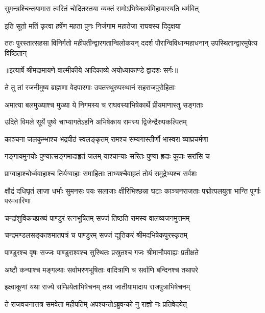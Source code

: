 \twolineshloka
{सुमन्त्रश्चिन्तयामास त्वरितं चोदितस्तया}
{व्यक्तं रामोऽभिषेकार्थमिहायास्यति धर्मवित्} %

\twolineshloka
{इति सूतो मतिं कृत्वा हर्षेण महता पुनः}
{निर्जगाम महातेजा राघवस्य दिदृक्षया} %

\fourlineindentedshloka
{ततः पुरस्तात्सहसा विनिर्गतो}
{महीपतीन्द्वारगतान्विलोकयन्}
{ददर्श पौरान्विविधान्महाधनान्}
{उपस्थितान्द्वारमुपेत्य विष्ठितान्} %


{॥इत्यार्षे श्रीमद्रामायणे वाल्मीकीये आदिकाव्ये अयोध्याकाण्डे द्वादशः सर्गः॥}


\twolineshloka
{ते तु तां रजनीमुष्य ब्राह्मणा वेदपारगाः}
{उपतस्थुरुपस्थानं सहराजपुरोहिताः} %

\twolineshloka
{अमात्या बलमुख्याश्च मुख्या ये निगमस्य च}
{राघवस्याभिषेकार्थे प्रीयमाणास्तु सङ्गताः} %

\twolineshloka
{उदिते विमले सूर्ये पुष्ये चाभ्यागतेऽहनि}
{अभिषेकाय रामस्य द्विजेन्द्रैरुपकल्पितम्} %

\twolineshloka
{काञ्चना जलकुम्भाश्च भद्रपीठं स्वलङ्कृतम्}
{रामश्च सम्यगास्तीर्णो भास्वरा व्याघ्रचर्मणा} %

\twolineshloka
{गङ्गायमुनयोः पुण्यात्सङ्गमादाहृतं जलम्}
{याश्चान्याः सरितः पुण्या ह्रदाः कूपाः सरांसि च} %

\twolineshloka
{प्राग्वाहाश्चोर्ध्ववाहाश्च तिर्यग्वाहाः समाहिताः}
{ताभ्यश्चैवाहृतं तोयं समुद्रेभ्यश्च सर्वशः} %

\threelineshloka
{क्षौद्रं दधिघृतं लाजा धर्भाः सुमनसः पयः}
{सलाजाः क्षीरिभिश्छन्ना घटाः काञ्चनराजताः}
{पद्मोत्पलयुता भान्ति पूर्णाः परमवारिणा} %

\twolineshloka
{चन्द्रांशुविकचप्रख्यं पाण्डुरं रत्नभूषितम्}
{सज्जं तिष्ठति रामस्य वालव्यजनमुत्तमम्} %

\twolineshloka
{चन्द्रमण्डलसङ्काशमातपत्रं च पाण्डुरम्}
{सज्जं द्युतिकरं श्रीमदभिषेकपुरस्कृतम्} %

\twolineshloka
{पाण्डुरश्च वृषः सज्जः पाण्डुराश्वश्च सुस्थितः}
{प्रस्रुतश्च गजः श्रीमानौपवाह्यः प्रतीक्षते} %

\twolineshloka
{अष्टौ कन्याश्च मङ्गल्याः सर्वाभरणभूषिताः}
{वादित्राणि च सर्वाणि बन्दिनश्च तथापरे} %

\twolineshloka
{इक्ष्वाकूणां यथा राज्ये सम्भ्रियेताभिषेचनम्}
{तथा जातीयामादाय राजपुत्राभिषेचनम्} %

\twolineshloka
{ते राजवचनात्तत्र समवेता महीपतिम्}
{अपश्यन्तोऽब्रुवन्को नु राज्ञो नः प्रतिवेदयेत्} %

